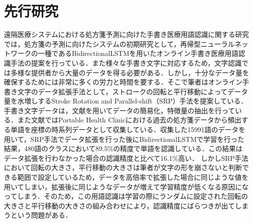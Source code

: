 \section{先行研究}
\label{sec:rel_4}
遠隔医療システムにおける処方箋予測に向けた手書き医療用語認識に関する研究\cite{takahashi}では，処方箋の予測に向けたシステムの初期研究として，再帰型ニューラルネットワークの一種であるBidirectionalLSTMを用いたオンライン手書き医療用語認識手法の提案を行っている．また様々な手書き文字に対応するため，文字認識では多様な提供者から大量のデータを得る必要がある．しかし，十分なデータ量を確保するためには非常に多くの労力と時間を要する．そこで筆者はオンライン手書き文字のデータ拡張手法として，ストロークの回転と平行移動によってデータ量を水増しするStroke Rotation and Parallel-shift（SRP）手法を提案している．
手書き文字データは，文献\cite{zhang18:drawing}を用いてデータの簡易化，特徴量の抽出を行っている．また文献\cite{takahashi}ではPortable Health Clinicにおける過去の処方箋データから頻出する単語を座標の時系列データとして収集している．収集した15991語のデータを用いて，SRP手法でデータ拡張を行った後にBidirectionalLSTMで学習を行った結果，480語のクラスにおいて89.5\%の精度で単語を認識している．この結果はデータ拡張を行わなかった場合の認識精度と比べて16.1\%高い．
しかしSRP手法において回転の大きさ，平行移動の大きさは筆者が文字の形を崩さないと判断できる範囲で設定しているため，データを高倍率で拡張した場合に同じような値を用いてしまい，拡張後に同じようなデータが増えて学習精度が低くなる原因になってしまう．そのため，この用語認識は学習の際にランダムに設定された回転の大きさと平行移動の大きさの組み合わせにより，認識精度にばらつきが出てしまうという問題がある．

